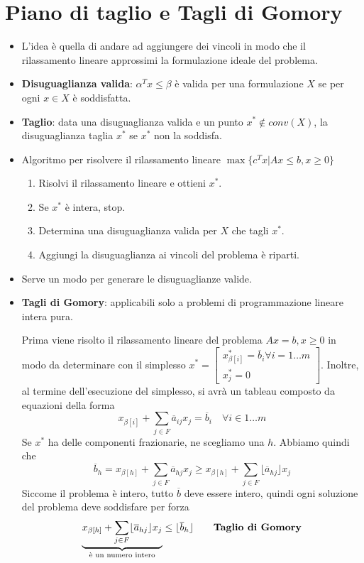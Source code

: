 \section{Piano di taglio e Tagli di Gomory}

\begin{itemize}
	\item L'idea è quella di andare ad aggiungere dei vincoli in modo che il rilassamento lineare approssimi la formulazione ideale del problema.
	\item \textbf{Disuguaglianza valida}: $\alpha^T x \leq \beta$ è valida per una formulazione $X$ se per ogni $x \in X$ è soddisfatta.
	\item \textbf{Taglio}: data una disuguaglianza valida e un punto $x^* \not\in conv(X)$, la disuguaglianza taglia $x^*$ se $x^*$ non la soddisfa.
	\item Algoritmo per risolvere il rilassamento lineare $\max \{ c^T x | Ax \leq b, x \geq 0 \}$
	\begin{enumerate}
		\item Risolvi il rilassamento lineare e ottieni $x^*$.
		\item Se $x^*$ è intera, stop.
		\item Determina una disuguaglianza valida per $X$ che tagli $x^*$.
		\item Aggiungi la disuguaglianza ai vincoli del problema è riparti.
	\end{enumerate}
	\item Serve un modo per generare le disuguaglianze valide.
	\item \textbf{Tagli di Gomory}: applicabili solo a problemi di programmazione lineare intera pura.
	
	Prima viene risolto il rilassamento lineare del problema $Ax = b, x\geq 0$ in modo da determinare con il simplesso $x^* = \begin{bmatrix}
	x_{\beta[i]}^* = \overline{b}_i \forall i = 1\ldots m \\
	x_{j}^* = 0
	\end{bmatrix}$.
	Inoltre, al termine dell'esecuzione del simplesso, si avrà un tableau composto da equazioni della forma
	$$
	x_{\beta[i]} + \sum_{j \in F} \overline{a}_{ij}x_j = \overline{b}_i \quad \forall i \in 1 \ldots m
	$$
	Se $x^*$ ha delle componenti frazionarie, ne scegliamo una $h$.
	Abbiamo quindi che
	$$
	\overline{b}_h = x_{\beta[h]} + \sum_{j \in F} \overline{a}_{hj}x_j \geq  x_{\beta[h]} + \sum_{j \in F} \lfloor\overline{a}_{hj}\rfloor x_j
	$$
	Siccome il problema è intero, tutto $\overline{b}$ deve essere intero, quindi ogni soluzione del problema deve soddisfare per forza
	$$
	 \underbrace{x_{\beta[h]} + \sum_{j \in F} \lfloor \overline{a}_{hj} \rfloor x_j}_{\text{è un numero intero}} \leq  \lfloor \overline{b}_h\rfloor \qquad\text{\textbf{Taglio di Gomory}}
	$$
	

\end{itemize}

